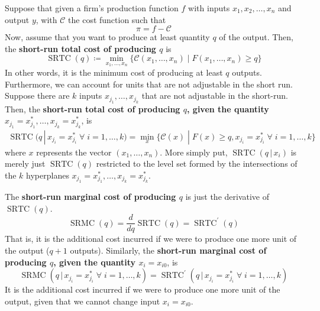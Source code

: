 \documentclass{article}
\DeclareMathOperator{\SRTC}{SRTC}
\DeclareMathOperator{\SRMC}{SRMC}
\begin{document}
      \begin{definition}
        \label{def:short-run-total-cost}
        Suppose that given a firm's production function $f$ with inputs $x_1, x_2, \ldots, x_n$ and output $y$, with $\mathcal{C}$ the cost function such that
        \begin{equation}
          \pi = f - \mathcal{C}
        \end{equation}
        Now, assume that you want to produce at least quantity $q$ of the output. Then, the \textbf{short-run total cost of producing $q$} is
        \begin{equation}
          \SRTC(q) \coloneqq \min_{x_1, \ldots, x_n} \{ \mathcal{C}(x_1, \ldots, x_n) \;|\; F(x_1, \ldots, x_n) \geq q\}
        \end{equation}
        In other words, it is the minimum cost of producing at least $q$ outputs. Furthermore, we can account for units that are not adjustable in the short run. Suppose there are $k$ inputs $x_{j_1}, \ldots, x_{j_k}$ that are not adjustable in the short-run. Then, the \textbf{short-run total cost of producing $q$, given the quantity $x_{j_1} = x_{j_1}^*, \ldots, x_{j_k} = x_{j_k}^*$}, is 
        \begin{align*}
            \SRTC(q\,|\, x_{j_i} = x_{j_i}^* \;\forall\; i = 1, \ldots, k) = \min_{x} \{ \mathcal{C}(x) \;|\; F(x) \geq q, x_{j_i} = x_{j_i}^* \;\forall\; i = 1, \ldots, k\}
        \end{align*}
        where $x$ represents the vector $(x_1, \ldots, x_n)$. 
        More simply put, $\SRTC(q\,|\, x_i)$ is merely just $\SRTC(q)$ restricted to the level set formed by the intersections of the $k$ hyperplanes $x_{j_1} = x_{j_1}^*, \ldots,  x_{j_k} = x_{j_k}^*$. 
      \end{definition}

      \begin{definition}
        \label{def:short-run-marginal-cost}
        The \textbf{short-run marginal cost of producing $q$} is just the derivative of $\SRTC(q)$. 
        \begin{equation}
          \SRMC(q) = \frac{d}{dq} \SRTC(q) = \SRTC^\prime (q)
        \end{equation}
        That is, it is the additional cost incurred if we were to produce one more unit of the output ($q+1$ outputs). Similarly, the \textbf{short-run marginal cost of producing $q$, given the quantity $x_i = x_{i0}$}, is 
        \begin{equation}
          \SRMC(q\,|\, x_{j_i} = x_{j_i}^* \;\forall\; i = 1, \ldots, k) = \SRTC^\prime (q\,|\, x_{j_i} = x_{j_i}^* \;\forall\; i = 1, \ldots, k)
        \end{equation}
        It is the additional cost incurred if we were to produce one more unit of the output, given that we cannot change input $x_i = x_{i0}$. 
      \end{definition}
\end{document}
